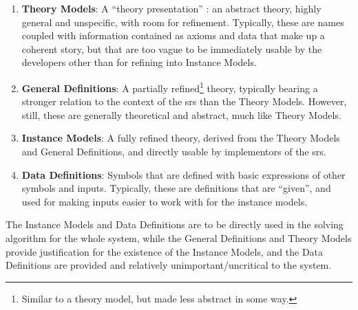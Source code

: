 \begin{enumerate}

	\item \textbf{Theory Models}: A ``theory presentation'' : an abstract theory, highly
	      general and unspecific, with room for refinement. Typically, these
	      are names coupled with information contained as axioms and data
	      that make up a coherent story, but that are too vague to be
	      immediately usable by the developers other than for refining into
	      Instance Models.

	\item \textbf{General Definitions}: A partially refined\footnote{Similar to
	      a theory model, but made less abstract in some way.} theory,
	      typically bearing a stronger relation to the context of the \acs{srs}
	      than the Theory Models. However, still, these are generally
	      theoretical and abstract, much like Theory Models.

	\item \textbf{Instance Models}: A fully refined theory, derived from the
	      Theory Models and General Definitions, and directly usable by
	      implementors of the \acs{srs}.

	\item \textbf{Data Definitions}: Symbols that are defined with basic
	      expressions of other symbols and inputs. Typically, these are
	      definitions that are ``given'', and used for making inputs easier to
	      work with for the instance models.

\end{enumerate}


The Instance Models and Data Definitions are to be directly used in the solving
algorithm for the whole system, while the General Definitions and Theory Models
provide justification for the existence of the Instance Models, and the Data
Definitions are provided and relatively unimportant/uncritical to the system.

